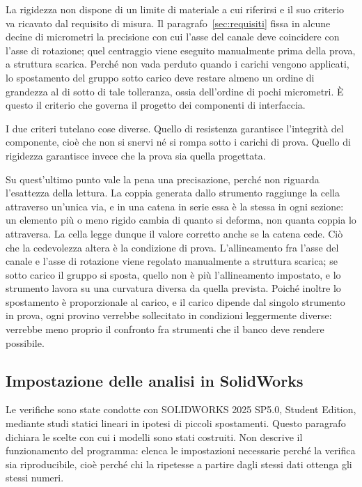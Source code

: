La rigidezza non dispone di un limite di materiale a cui riferirsi e il suo
criterio va ricavato dal requisito di misura. Il paragrafo~\ref{sec:requisiti}
fissa in alcune decine di micrometri la precisione con cui l'asse del canale
deve coincidere con l'asse di rotazione; quel centraggio viene eseguito
manualmente prima della prova, a struttura scarica. Perché non vada perduto
quando i carichi vengono applicati, lo spostamento del gruppo sotto carico deve
restare almeno un ordine di grandezza al di sotto di tale tolleranza, ossia
dell'ordine di pochi micrometri. È questo il criterio che governa il progetto
dei componenti di interfaccia.

I due criteri tutelano cose diverse. Quello di resistenza garantisce l'integrità
del componente, cioè che non si snervi né si rompa sotto i carichi di prova.
Quello di rigidezza garantisce invece che la prova sia quella progettata.

Su quest'ultimo punto vale la pena una precisazione, perché non riguarda
l'esattezza della lettura. La coppia generata dallo strumento raggiunge la cella
attraverso un'unica via, e in una catena in serie essa è la stessa in ogni
sezione: un elemento più o meno rigido cambia di quanto si deforma, non quanta
coppia lo attraversa. La cella legge dunque il valore corretto anche se la
catena cede. Ciò che la cedevolezza altera è la condizione di prova.
L'allineamento fra l'asse del canale e l'asse di rotazione viene regolato
manualmente a struttura scarica; se sotto carico il gruppo si sposta, quello non
è più l'allineamento impostato, e lo strumento lavora su una curvatura diversa
da quella prevista. Poiché inoltre lo spostamento è proporzionale al carico, e
il carico dipende dal singolo strumento in prova, ogni provino verrebbe
sollecitato in condizioni leggermente diverse: verrebbe meno proprio il
confronto fra strumenti che il banco deve rendere possibile.

\subsection{Impostazione delle analisi in SolidWorks}
\label{sec:fem-solidworks}

Le verifiche sono state condotte con SOLIDWORKS 2025 SP5.0, Student Edition,
mediante studi statici lineari in ipotesi di piccoli spostamenti. Questo
paragrafo dichiara le scelte con cui i modelli sono stati costruiti. Non
descrive il funzionamento del programma: elenca le impostazioni necessarie
perché la verifica sia riproducibile, cioè perché chi la ripetesse a partire
dagli stessi dati ottenga gli stessi numeri.

